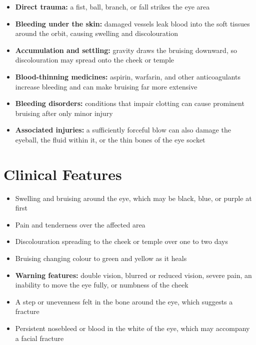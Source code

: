 \begin{itemize}
    \item \textbf{Direct trauma:} a fist, ball, branch, or fall strikes the eye area
    \item \textbf{Bleeding under the skin:} damaged vessels leak blood into the soft tissues around the orbit, causing swelling and discolouration
    \item \textbf{Accumulation and settling:} gravity draws the bruising downward, so discolouration may spread onto the cheek or temple
    \item \textbf{Blood-thinning medicines:} aspirin, warfarin, and other anticoagulants increase bleeding and can make bruising far more extensive
    \item \textbf{Bleeding disorders:} conditions that impair clotting can cause prominent bruising after only minor injury
    \item \textbf{Associated injuries:} a sufficiently forceful blow can also damage the eyeball, the fluid within it, or the thin bones of the eye socket
\end{itemize}

\section*{Clinical Features}
\begin{itemize}
    \item Swelling and bruising around the eye, which may be black, blue, or purple at first
    \item Pain and tenderness over the affected area
    \item Discolouration spreading to the cheek or temple over one to two days
    \item Bruising changing colour to green and yellow as it heals
    \item \textbf{Warning features:} double vision, blurred or reduced vision, severe pain, an inability to move the eye fully, or numbness of the cheek
    \item A step or unevenness felt in the bone around the eye, which suggests a fracture
    \item Persistent nosebleed or blood in the white of the eye, which may accompany a facial fracture
\end{itemize}

